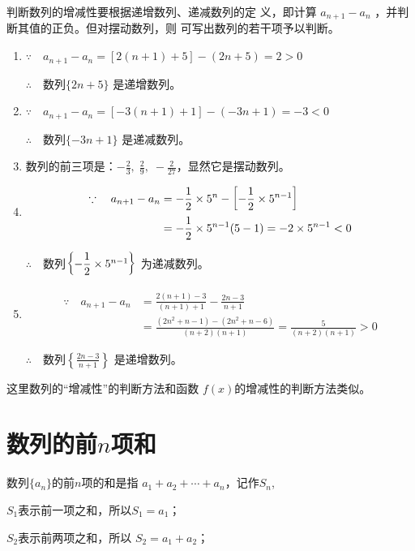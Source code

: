 \begin{solution}
判断数列的增减性要根据递增数列、递减数列的定
义，即计算
$a_{n+1}-a_n$
，并判断其值的正负。但对摆动数列，则
可写出数列的若干项予以判断。
\begin{enumerate}[(1)]
    \item $\because\quad a_{n+1}-a_n=[2(n+1)+5]-(2n+5)=2>0$
    
$\therefore\quad $数列$\{2n+5\}$
是递增数列。

\item $\because\quad a_{n+1}-a_n=[-3(n+1)+1]-(-3n+1)=-3<0$
    
$\therefore\quad $数列$\{-3n+1\}$
是递减数列。
\item 数列的前三项是：$-\frac{2}{3},\; \frac{2}{9},\; -\frac{2}{27}$，显然它是摆动数列。

\item \[\begin{split}
    \because\quad a_{n+1}-a_n&=-\dfrac{1}{2}\times 5^n-\left[-\dfrac{1}{2}\times 5^{n-1}\right]\\
    &=-\dfrac{1}{2}\times 5^{n-1}(5-1)=-2\times 5^{n-1}<0
\end{split}\]

$\therefore\quad $数列$\left\{-\dfrac{1}{2}\times 5^{n-1}\right\}$
为递减数列。

\item \[\begin{split}
    \because\quad a_{n+1}-a_n&=  \frac{2(n+1)-3}{(n+1)+1}-\frac{2n-3}{n+1}\\
    &=\frac{(2n^2+n-1)-(2n^2+n-6)}{(n+2)(n+1)}=\frac{5}{(n+2)(n+1)}>0
\end{split}\]

$\therefore\quad $数列$\left\{\frac{2n-3}{n+1}\right\}$
是递增数列。
\end{enumerate}
\end{solution}

\begin{rmk}
    这里数列的“增减性”的判断方法和函数
$f(x)$的增减性的判断方法类似。
\end{rmk}

\section{数列的前$n$项和}
数列$\{a_n\}$的前$n$项的和是指
$a_1+a_2+\cdots+a_n$，记作$S_n$,

$S_1$表示前一项之和，所以$S_1=a_1$；

$S_2$表示前两项之和，所以
$S_2=a_1+a_2$；

